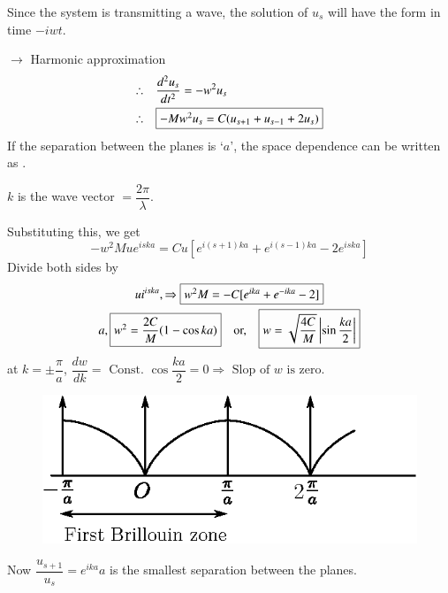 Since the system is transmitting a wave, the solution of $u_{s}$ will have the form in time $-iwt$.

$\to$ Harmonic approximation
\begin{align*}
\therefore\quad & \dfrac{d^{2}u_{s}}{dt^{2}}=-w^{2}u_{s}\\
\therefore\quad & \fbox{$-Mw^{2}u_{s}=C(u_{s+1}+u_{s-1}+2u_{s})$}
\end{align*}
If the separation between the planes is `$a$', the space dependence can be written as .

$k$ is the wave vector $=\dfrac{2\pi}{\lambda}$.

Substituting this, we get
$$
-w^{2}Mue^{iska}=Cu\left[e^{i(s+1)ka}+e^{i(s-1)ka}-2e^{iska}\right]
$$
Divide both sides by
\begin{gather*}
ui^{iska},\Rightarrow \fbox{$w^{2}M=-C[e^{ika}+e^{-ika}-2]$}\\
a, \fbox{$w^{2}=\dfrac{2C}{M}(1-\cos ka)$}\quad \text{or,}\quad \fbox{$w=\sqrt{\dfrac{4C}{M}}\left|\sin \dfrac{ka}{2}\right|$}
\end{gather*}
at $k=\pm \dfrac{\pi}{a}$, $\dfrac{dw}{dk}=\text{ Const. } \cos \dfrac{ka}{2}=0\Rightarrow \text{ Slop of $w$ is zero.}$
\begin{figure}[H]
\centering
\includegraphics{images/lecture17/fig2.eps}
\end{figure}

Now $\dfrac{u_{s+1}}{u_{s}}=e^{ika}$\quad $a$ is the smallest separation between the planes.

